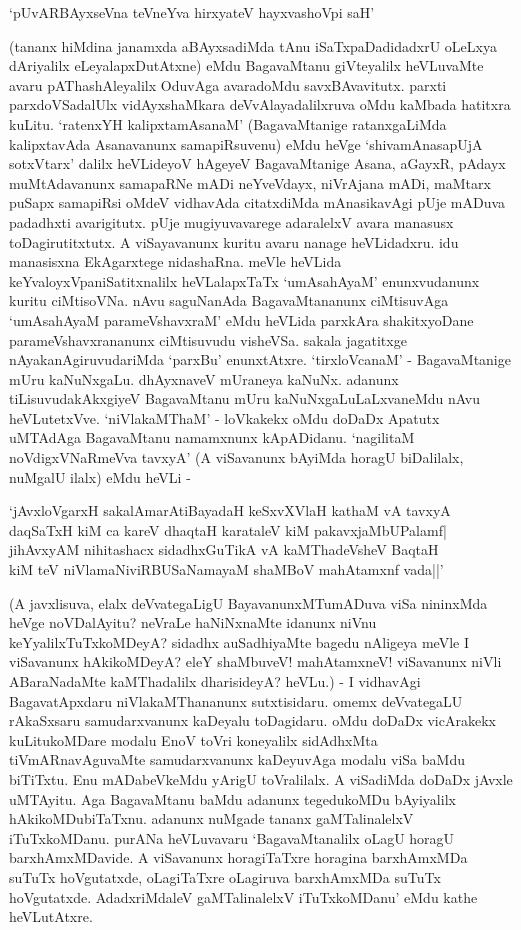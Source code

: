 \begin{shloka}
`pUvARBAyxseVna teVneYva hirxyateV hayxvashoV\s pi saH'
\end{shloka}

(tananx hiMdina janamxda aBAyxsadiMda tAnu iSaTxpaDadidadxrU oLeLxya dAriyalilx eLeyalapxDutAtxne) eMdu BagavaMtanu giVteyalilx heVLuvaMte avaru pAThashAleyalilx OduvAga avaradoMdu savxBAvavitutx. parxti parxdoVSadalUlx vidAyxshaMkara deVvAlayadalilxruva oMdu kaMbada hatitxra kuLitu. `ratenxYH kalipxtamAsanaM' (BagavaMtanige ratanxgaLiMda kalipxtavAda Asanavanunx samapiRsuvenu) eMdu heVge `shivamAnasapUjA sotxVtarx' dalilx heVLideyoV hAgeyeV BagavaMtanige Asana, aGayxR, pAdayx muMtAdavanunx samapaRNe mADi neYveVdayx, niVrAjana mADi, maMtarx puSapx samapiRsi oMdeV vidhavAda citatxdiMda mAnasikavAgi pUje mADuva padadhxti avarigitutx. pUje mugiyuvavarege adaralelxV avara manasusx toDagirutitxtutx. A viSayavanunx kuritu avaru nanage heVLidadxru. idu manasisxna EkAgarxtege nidashaRna. meVle heVLida keYvaloyxVpaniSatitxnalilx heVLalapxTaTx `umAsahAyaM' enunxvudanunx kuritu ciMtisoVNa. nAvu saguNanAda BagavaMtananunx ciMtisuvAga `umAsahAyaM parameVshavxraM' eMdu heVLida parxkAra shakitxyoDane parameVshavxrananunx ciMtisuvudu visheVSa. sakala jagatitxge nAyakanAgiruvudariMda `parxBu' enunxtAtxre. `tirxloVcanaM' - BagavaMtanige mUru kaNuNxgaLu. dhAyxnaveV mUraneya kaNuNx. adanunx tiLisuvudakAkxgiyeV BagavaMtanu mUru kaNuNxgaLuLaLxvaneMdu nAvu heVLutetxVve. `niVlakaMThaM' - loVkakekx oMdu doDaDx Apatutx uMTAdAga BagavaMtanu namamxnunx kApADidanu. `nagilitaM noVdigxVNaRmeVva tavxyA' (A viSavanunx bAyiMda horagU biDalilalx, nuMgalU ilalx) eMdu heVLi - 

\begin{shloka}
`jAvxloVgarxH sakalAmarAtiBayadaH keSxvXVlaH kathaM vA tavxyA\\
daqSaTxH kiM ca kareV dhaqtaH karataleV kiM pakavxjaMbUPalamf|\\
jihAvxyAM nihitashacx sidadhxGuTikA vA kaMThadeVsheV BaqtaH\\
kiM teV niVlamaNiviRBUSaNamayaM shaMBoV mahAtamxnf vada||'
\end{shloka}

(A javxlisuva, elalx deVvategaLigU BayavanunxMTumADuva viSa nininxMda heVge noVDalAyitu? neVraLe haNiNxnaMte idanunx niVnu keYyalilxTuTxkoMDeyA? sidadhx auSadhiyaMte bagedu nAligeya meVle I viSavanunx hAkikoMDeyA? eleY shaMbuveV! mahAtamxneV! viSavanunx niVli ABaraNadaMte kaMThadalilx dharisideyA? heVLu.) - I vidhavAgi BagavatApxdaru niVlakaMThananunx sutxtisidaru. omemx deVvategaLU rAkaSxsaru samudarxvanunx kaDeyalu toDagidaru. oMdu doDaDx vicArakekx kuLitukoMDare modalu EnoV toVri koneyalilx sidAdhxMta tiVmARnavAguvaMte samudarxvanunx kaDeyuvAga modalu viSa baMdu biTiTxtu. Enu mADabeVkeMdu yArigU toVralilalx. A viSadiMda doDaDx jAvxle uMTAyitu. Aga BagavaMtanu baMdu adanunx tegedukoMDu bAyiyalilx hAkikoMDubiTaTxnu. adanunx nuMgade tananx gaMTalinalelxV iTuTxkoMDanu. purANa heVLuvavaru `BagavaMtanalilx oLagU horagU barxhAmxMDavide. A viSavanunx horagiTaTxre horagina barxhAmxMDa suTuTx hoVgutatxde, oLagiTaTxre oLagiruva barxhAmxMDa suTuTx hoVgutatxde. AdadxriMdaleV gaMTalinalelxV iTuTxkoMDanu' eMdu kathe heVLutAtxre.

